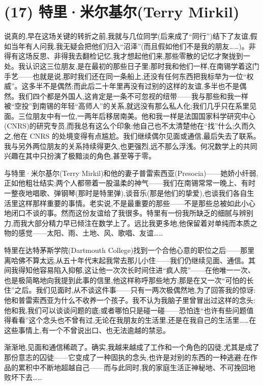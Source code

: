 \section{(17) 特里·米尔基尔(Terry Mirkil)}

说真的,早在这场关键的转折之前,我就与几位同学(后来成了“同行”)结下了友谊,假如当年有人问我,我无疑会把他们归入“沼泽”(而且假如他们不是我的朋友……)。非得有这场反思、非得我去翻检记忆,我才想起他们来,那些零散的记忆才聚拢到一处。我认识这三位朋友,是在最初的那些日子里;那时我和他们一样,在南锡学着这门手艺——也就是说,那时我们还在同一条船上,还没有任何东西把我标举为一位“权威”。这多半不是偶然;而此后二十年里再没有过别的这样的友谊,多半也不是偶然。我们四个都是外国人,这肯定是一条不可忽视的纽带——我与那些和我一样被“空投”到南锡的年轻“高师人”的关系,就远没有那么私人化;我们几乎只在系里见面。三位朋友中有一位,一两年后移居南美。他和我一样是法国国家科学研究中心(CNRS)的研究专员,而我总有这么个印象:他自己也不太清楚他在“找”什么;久而久之,他在 CNRS 的处境变得有点尴尬。我们继续偶尔见面或通信,最后失去了联系。我与另外两位朋友的关系持续得更久,也更强烈,远不那么浮浅。何况数学上的共同兴趣在其中只扮演了极黯淡的角色,甚至等于零。

与特里·米尔基尔(Terry Mirkil)和他的妻子普雷索西亚(Presocia)——她娇小纤弱,正如他粗壮结实;两个人都带着一股温柔的神气——我们在南锡常常一晚上、有时一整夜地唱歌、弹钢琴(那时是特里弹),谈音乐(那是他们的挚爱),也谈我们各自生活里这样那样重要的事情。老实说,不是最重要的那些——不是那些总被如此小心地闭口不谈的事。然而这份友谊给了我很多。特里有一份我所缺乏的细腻与辨别力,而我大部分精力早已倾注在数学上了。远比我更多地,他保留着对单纯而本质之物的感觉——太阳、雨、土地、风、歌唱、友谊……

特里在达特茅斯学院(Dartmouth College)找到一个合他心意的职位之后——那里离哈佛不算太远,从五十年代末起我常去那儿小住——我们仍继续见面、通信。其间我得知他容易陷入抑郁,这让他一次次长时间住进“疯人院”——在他唯一一次、也是极简略地向我提到此事的信里,他这样称呼那些地方;那是在又一次“可怕的长住”之后。我们见面时,从不谈这件事——只有一两次极偶然地,为了回答我的惊讶:他和普雷索西亚为什么不收养一个孩子。我不认为我脑子里曾冒出过这样的念头:他和我,我们可以谈谈问题的底;或者哪怕只是碰一碰——恐怕连“也许有些问题值得看看”这个念头也不曾有过,无论在我朋友的生活里,还是在我自己的生活里……在这些事情上,有一个不曾说出口、也无法逾越的禁忌。

渐渐地,见面和通信稀疏了。确实,我越来越成了工作和一个角色的囚徒,尤其是成了那份意志的囚徒——它变成了一种固执的念头,也许是对别的东西的一种逃避:在作品的累积中不断地超越自己——而与此同时,我的家庭生活正神秘地、不可挽回地败坏下去……

